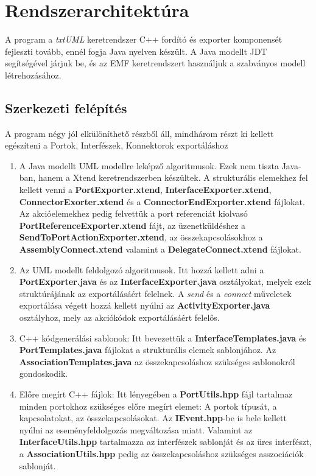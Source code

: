 \documentclass[a4paper,12pt]{report}
\begin{document}
\section{Rendszerarchitektúra}
A program a \textit{txtUML} keretrendszer C++ fordító és exporter komponensét fejleszti tovább, ennél fogja Java nyelven készült. A Java modellt JDT segítségével járjuk be, és az EMF keretrendszert használjuk a szabványos modell létrehozásához. \\

\subsection{Szerkezeti felépítés}
A program négy jól elkülöníthető részből áll, mindhárom részt ki kellett egészíteni a Portok, Interfészek, Konnektorok exportáláshoz

\begin{enumerate}
\item A Java modellt UML modellre leképző algoritmusok. Ezek nem tiszta Java-ban, hanem a Xtend keretrendszerben készültek. A strukturális elemekhez fel kellett venni a \textbf{PortExporter.xtend}, \textbf{InterfaceExporter.xtend}, \textbf{ConnectorExorter.xtend} és a \textbf{ConnectorEndExporter.xtend} fájlokat. Az akcióelemekhez pedig felvettük a port referenciát kiolvasó \textbf{PortReferenceExporter.xtend} fájt, az üzenetküldéshez a \textbf{SendToPortActionExporter.xtend}, az összekapcsolásokhoz a \textbf{AssemblyConnect.xtend} valamint a \textbf{DelegateConnect.xtend} fájlokat.
\item Az UML modellt feldolgozó algoritmusok. Itt hozzá kellett adni a  \textbf{PortExporter.java} és az \textbf{InterfaceExporter.java} osztályokat, melyek ezek struktúrájának az exportálásáért felelnek. A \textit{send} és a \textit{connect} műveletek exportálása végett hozzá kellett nyúlni az \textbf{ActivityExporter.java} osztályhoz, mely az akciókódok exportálásáért felelős.
\item C++ kódgenerálási sablonok: Itt bevezettük a \textbf{InterfaceTemplates.java} és \textbf{PortTemplates.java} fájlokat a strukturális elemek sablonjához. Az \textbf{AssociationTemplates.java} az összekapcsoláshoz szükséges sablonokról gondoskodik.
\item Előre megírt C++ fájlok: Itt lényegében a \textbf{PortUtils.hpp} fájl tartalmaz minden portokhoz szükséges előre megírt elemet: A portok típusát, a kapcsolatokat, az összekapcsolásokat. Az \textbf{IEvent.hpp}-be is bele kellett nyúlni az eseményfeldolgozás megváltozása miatt. Valamint az \textbf{InterfaceUtils.hpp} tartalmazza az interfészek sablonját és az üres interfészt, a \textbf{AssociationUtils.hpp} pedig az összekapcsoláshoz szükséges asszociációk sablonját.
\end{enumerate}
\end{document}
